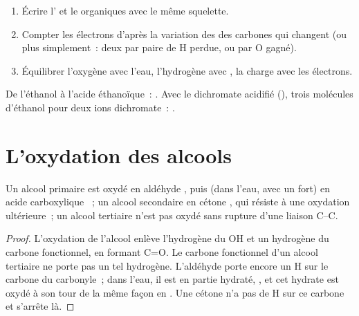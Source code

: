 \begin{method}\label{met:b1:organic-redox:balance-organic-redox}
\begin{enumerate}
  \item Écrire l' et le  organiques avec le même
        squelette.
  \item Compter les électrons d'après la variation des  des carbones qui changent (ou plus simplement~: deux
        par paire de H perdue, ou par O gagné).
  \item Équilibrer l'oxygène avec l'eau, l'hydrogène avec , la
        charge avec les électrons.
\end{enumerate}
De l'éthanol à l'acide éthanoïque~: .
Avec le dichromate acidifié (),
trois molécules d'éthanol pour deux ions dichromate~:
.
\end{method}

\section{L'oxydation des alcools}

\begin{proposition}\label{prop:b1:organic-redox:alcohol-oxidation}
Un alcool primaire  est oxydé en aldéhyde , puis
(dans l'eau, avec un  fort) en acide carboxylique ~; un
alcool secondaire  en cétone , qui résiste à une
oxydation ultérieure~; un alcool tertiaire  n'est pas oxydé
sans rupture d'une liaison C--C.
\end{proposition}

\begin{proof}
L'oxydation de l'alcool enlève l'hydrogène du OH et un hydrogène du
carbone fonctionnel, en formant C=O. Le carbone fonctionnel d'un alcool
tertiaire ne porte pas un tel hydrogène. L'aldéhyde porte encore un H
sur le carbone du carbonyle~; dans l'eau, il est en partie hydraté,
, et cet hydrate est oxydé à son tour de la même façon en
. Une cétone n'a pas de H sur ce carbone et s'arrête là.
\end{proof}

